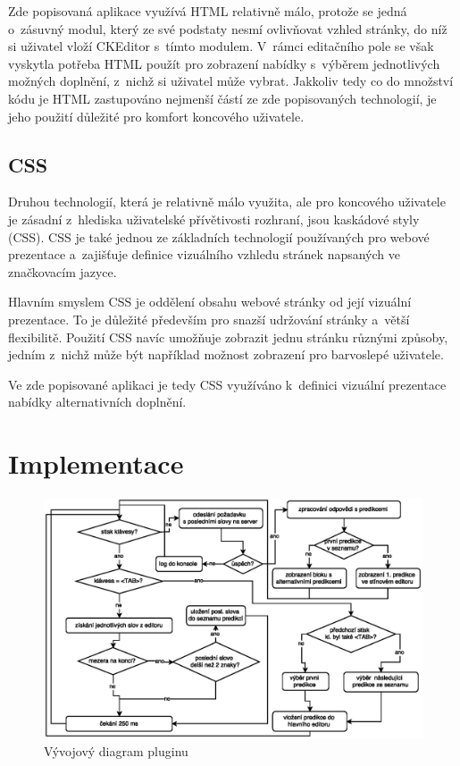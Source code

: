 \documentclass[a4paper,11pt,openany]{book} %
\begin{document}
Zde popisovaná aplikace využívá HTML relativně málo, protože se jedná o~zásuvný modul, který ze své podstaty nesmí ovlivňovat vzhled stránky, do níž si uživatel vloží CKEditor s~tímto modulem. V~rámci editačního pole se však vyskytla potřeba HTML použít pro zobrazení nabídky s~výběrem jednotlivých možných doplnění, z~nichž si uživatel může vybrat. Jakkoliv tedy co do množství kódu je HTML zastupováno nejmenší částí ze zde popisovaných technologií, je jeho použití důležité pro komfort koncového uživatele.

\section{CSS}

Druhou technologií, která je relativně málo využita, ale pro koncového uživatele je zásadní z~hlediska uživatelské přívětivosti rozhraní, jsou kaskádové styly (CSS). CSS je také jednou ze základních technologií používaných pro webové prezentace a~zajišťuje definice vizuálního vzhledu stránek napsaných ve značkovacím jazyce. \parencite{meyer2004cascading}

Hlavním smyslem CSS je oddělení obsahu webové stránky od její vizuální prezentace. To je důležité především pro snazší udržování stránky a~větší flexibilitě. Použití CSS navíc umožňuje zobrazit jednu stránku různými způsoby, jedním z~nichž může být například možnost zobrazení pro barvoslepé uživatele.

Ve zde popisované aplikaci je tedy CSS využíváno k~definici vizuální prezentace nabídky alternativních doplnění.

\chapter{Implementace}

\begin{figure}[h]
	\centering
	\includegraphics[width=1.0\textwidth]{autocomplete_floatchart.eps}
	\caption{Vývojový diagram pluginu}
	\label{fig:phoneKeyboard}
\end{figure}
\end{document}
